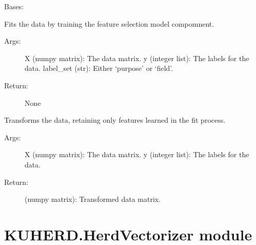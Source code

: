 \documentclass[letterpaper,10pt,english]{sphinxmanual}
\begin{document}
\begin{fulllineitems}
\label{\detokenize{KUHERD:KUHERD.FeatureSelector.FeatureSelector}}
Bases: 

\begin{fulllineitems}
\label{\detokenize{KUHERD:KUHERD.FeatureSelector.FeatureSelector.fit}}
Fits the data by training the feature selection model compomnent.
\begin{description}
\item[{Args:}] \leavevmode
X (numpy matrix): The data matrix.
y (integer list): The labels for the data.
label\_set (str): Either `purpose' or `field'.

\item[{Return:}] \leavevmode
None

\end{description}

\end{fulllineitems}


\begin{fulllineitems}
\label{\detokenize{KUHERD:KUHERD.FeatureSelector.FeatureSelector.transform}}
Transforms the data, retaining only features learned in the \sphinxquotedblleft{}fit\sphinxquotedblright{} process.
\begin{description}
\item[{Args:}] \leavevmode
X (numpy matrix): The data matrix.
y (integer list): The labels for the data.

\item[{Return:}] \leavevmode
(numpy matrix): Transformed data matrix.

\end{description}

\end{fulllineitems}


\end{fulllineitems}



\section{KUHERD.HerdVectorizer module}
\label{\detokenize{KUHERD:kuherd-herdvectorizer-module}}\label{\detokenize{KUHERD:module-KUHERD.HerdVectorizer}}
\end{document}
